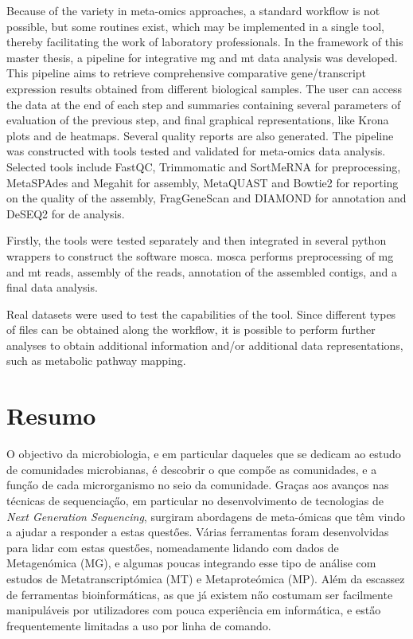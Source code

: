 \documentclass[
  oneside,
  11pt, a4paper,
  footinclude=true,
  headinclude=true,
  cleardoublepage=empty
]{scrbook}
\begin{document}
    Because of the variety in meta-omics approaches, a standard workflow is not possible, but some routines exist, which may be implemented in a single tool, thereby facilitating the work of laboratory professionals. In the framework of this master thesis, a pipeline for integrative \gls{mg} and \gls{mt} data analysis was developed. This pipeline aims to retrieve comprehensive comparative gene/transcript expression results obtained from different biological samples. The user can access the data at the end of each step and summaries containing several parameters of evaluation of the previous step, and final graphical representations, like Krona plots and \gls{de} heatmaps. Several quality reports are also generated. The pipeline was constructed with tools tested and validated for meta-omics data analysis. Selected tools include FastQC, Trimmomatic and SortMeRNA for preprocessing, MetaSPAdes and Megahit for assembly, MetaQUAST and Bowtie2 for reporting on the quality of the assembly, FragGeneScan and DIAMOND for annotation and DeSEQ2 for \gls{de} analysis.
    
    Firstly, the tools were tested separately and then integrated in several python wrappers to construct the software \gls{mosca}. \gls{mosca} performs preprocessing of \gls{mg} and \gls{mt} reads, assembly of the reads, annotation of the assembled contigs, and a final data analysis. 
    
    Real datasets were used to test the capabilities of the tool. Since different types of files can be obtained along the workflow, it is possible to perform further analyses to obtain additional information and/or additional data representations, such as metabolic pathway mapping. 
    
	\cleardoublepage
	\chapter*{Resumo}
	
	O objectivo da microbiologia, e em particular daqueles que se dedicam ao estudo de comunidades microbianas, \'{e} descobrir o que comp\H{o}e as comunidades, e a fun\c{c}\H{a}o de cada microrganismo no seio da comunidade. Gra\c{c}as aos avan\c{c}os nas t\'{e}cnicas de sequencia\c{c}\H{a}o, em particular no desenvolvimento de tecnologias de \textit{Next Generation Sequencing}, surgiram abordagens de meta-\'{o}micas que t\^{e}m vindo a ajudar a responder a estas quest\H{o}es. V\'{a}rias ferramentas foram desenvolvidas para lidar com estas quest\H{o}es, nomeadamente lidando com dados de Metagen\'{o}mica (MG), e algumas poucas integrando esse tipo de an\'{a}lise com estudos de Metatranscript\'{o}mica (MT) e Metaprote\'{o}mica (MP). Al\'{e}m da escassez de ferramentas bioinform\'{a}ticas, as que j\'{a} existem n\H{a}o costumam ser facilmente manipul\'{a}veis por utilizadores com pouca experi\^{e}ncia em inform\'{a}tica, e est\H{a}o frequentemente limitadas a uso por linha de comando.
	
\end{document}
